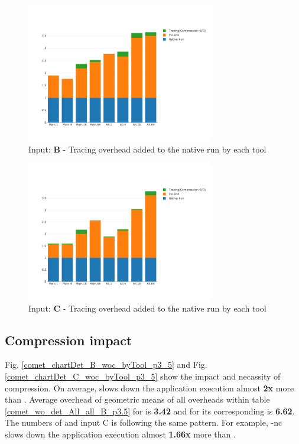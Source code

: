 \begin{figure}[!t]
\centering
\includegraphics[width=3.2in]{figs.comet.newMed/comet_chartDet_B_wc_byTool_p3_5.png}
\caption{ Input: \textbf{B} - Tracing overhead added to the native run by each tool}
\label{comet_chartDet_B_wc_byTool_p3_5}
\end{figure}


\begin{figure}[!t]
\centering
\includegraphics[width=3.2in]{figs.comet.newMed/comet_chartDet_C_wc_byTool_p3_5.png}
\caption{ Input: \textbf{C} - Tracing overhead added to the native run by each tool
}
\label{comet_chartDet_C_wc_byTool_p3_5}
\end{figure}




\subsection{Compression impact} 
\label{subsec:compact}

Fig. \ref{comet_chartDet_B_woc_byTool_p3_5} and Fig. \ref{comet_chartDet_C_woc_byTool_p3_5} show the impact and necassity of compression. On average, \parlotnc slows down the application execution almost \textbf{2x} more than \parlota. Average overhead of geometric means of all overheads within table \ref{comet_wo_det_All_all_B_p3.5} for \parlota is \textbf{3.42} and for its corresponding \parlotnc is \textbf{6.62}. The numbers of \parlotm and input C is following the same pattern. For example, \parlot-nc slows down the application execution almost \textbf{1.66x} more than \parlotm.


